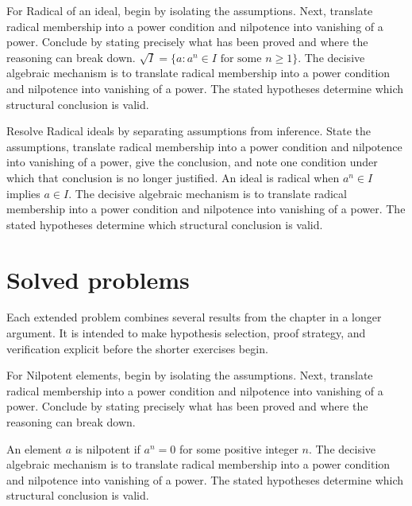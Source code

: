 \begin{example}\label{ex:v03-worked-03}
For Radical of an ideal, begin by isolating the assumptions. Next, translate radical membership into a power condition and nilpotence into vanishing of a power. Conclude by stating precisely what has been proved and where the reasoning can break down. $\sqrt I=\{a:a^n\in I\text{ for some }n\ge1\}$. The decisive algebraic mechanism is to translate radical membership into a power condition and nilpotence into vanishing of a power. The stated hypotheses determine which structural conclusion is valid.
\end{example}

\begin{example}\label{ex:v03-worked-04}
Resolve Radical ideals by separating assumptions from inference. State the assumptions, translate radical membership into a power condition and nilpotence into vanishing of a power, give the conclusion, and note one condition under which that conclusion is no longer justified. An ideal is radical when $a^n\in I$ implies $a\in I$. The decisive algebraic mechanism is to translate radical membership into a power condition and nilpotence into vanishing of a power. The stated hypotheses determine which structural conclusion is valid.
\end{example}

\section{Solved problems}
Each extended problem combines several results from the chapter in a longer argument. It is intended to make hypothesis selection, proof strategy, and verification explicit before the shorter exercises begin.

\begin{problem}\label{prob:v03-problem-01}
For Nilpotent elements, begin by isolating the assumptions. Next, translate radical membership into a power condition and nilpotence into vanishing of a power. Conclude by stating precisely what has been proved and where the reasoning can break down.
\end{problem}
\begin{solution}
An element $a$ is nilpotent if $a^n=0$ for some positive integer $n$. The decisive algebraic mechanism is to translate radical membership into a power condition and nilpotence into vanishing of a power. The stated hypotheses determine which structural conclusion is valid.
\end{solution}

